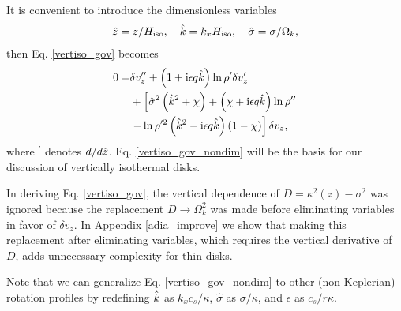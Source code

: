 It is convenient to introduce the dimensionless variables
\begin{align}
  \hat{z} = z/H_\mathrm{iso},\quad \hat{k}=k_xH_\mathrm{iso}, \quad \hat{\sigma} = \sigma/\Omega_k,
\end{align}
then Eq. \ref{vertiso_gov} becomes
\begin{align}
  0=& \delta v_z ^{\prime\prime} + \left(1 + \mathrm{i}\epsilon
    q\hat{k}\right)\ln\rho^{\prime}\delta v_z^\prime \notag\\
  &+
  \left[\hat{\sigma}^2\left(\hat{k}^2+\chi\right) +
    \left(  \chi + \mathrm{i} \epsilon q\hat{k}\right)\ln\rho^{\prime\prime}\right.
  \notag\\
  &\left.- \ln\rho^{\prime
      2}\left(\hat{k}^2 -
      \mathrm{i}\epsilon
      q\hat{k}\right)\left(1 - \chi\right)\right]\delta v_z,\label{vertiso_gov_nondim}
\end{align}
where $^\prime$ denotes $d/d\hat{z}$. Eq. \ref{vertiso_gov_nondim} will
be the basis for our discussion of vertically isothermal disks. %

In deriving Eq. \ref{vertiso_gov}, the vertical dependence of
$D=\kappa^2(z)-\sigma^2$ was ignored because the replacement
$D\to\Omega_k^2$ was made before eliminating variables in favor of
$\delta v_z$. In Appendix \ref{adia_improve} we show that making this
replacement after eliminating variables, which requires the vertical
derivative of $D$, adds unnecessary complexity for thin disks.  


Note that we can generalize Eq. \ref{vertiso_gov_nondim} to other
(non-Keplerian) rotation profiles by redefining $\hat{k}$
as $k_xc_s/\kappa$, $\hat{\sigma}$ as $\sigma/\kappa$, and 
$\epsilon$ as $c_s/r\kappa$.    



